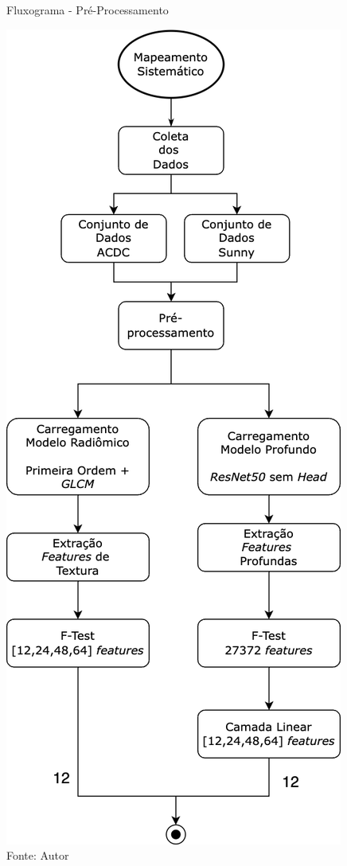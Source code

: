\begin{figure}[H]
    \centering
    \caption{Fluxograma - Pré-Processamento}
    \includegraphics[scale=0.36]{figures/fig015-01.png}
    \caption*{Fonte: Autor}
    \label{fig:fig015-01}
\end{figure}

